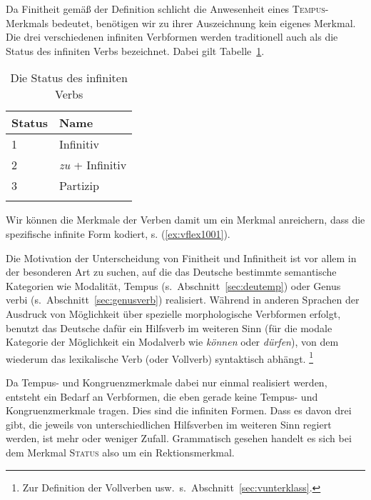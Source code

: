 
Da Finitheit gemäß der Definition schlicht die Anwesenheit eines \textsc{Tempus}-\-Merk\-mals bedeutet, benötigen wir zu ihrer Auszeichnung kein eigenes Merkmal.
Die drei verschiedenen infiniten Verbformen werden traditionell auch als die Status des infiniten Verbs bezeichnet.
Dabei gilt Tabelle~\ref{tab:status}.

\begin{table}
  \centering
  \begin{tabular}{ll}
    \lsptoprule
    \textbf{Status} & \textbf{Name} \\
    \midrule
    1 & Infinitiv \\
    2 & \textit{zu} + Infinitiv \\
    3 & Partizip \\
    \lspbottomrule
  \end{tabular}
  \caption{Die Status des infiniten Verbs}
  \label{tab:status}
\end{table}

Wir können die Merkmale der Verben damit um ein Merkmal anreichern, dass die spezifische infinite Form kodiert, s. (\ref{ex:vflex1001}).

\begin{exe}
\end{exe}

Die Motivation der Unterscheidung von Finitheit und Infinitheit ist vor allem in der besonderen Art zu suchen, auf die das Deutsche bestimmte semantische Kategorien wie Modalität, Tempus (s.\ Abschnitt~\ref{sec:deutemp}) oder Genus verbi (s.\ Abschnitt~\ref{sec:genusverb}) realisiert.
Während in anderen Sprachen \zB der Ausdruck von Möglichkeit über spezielle morphologische Verbformen erfolgt, benutzt das Deutsche dafür ein Hilfsverb im weiteren Sinn (für die modale Kategorie der Möglichkeit ein Modalverb wie \textit{können} oder \textit{dürfen}), von dem wiederum das lexikalische Verb (oder Vollverb) syntaktisch abhängt.%
\footnote{Zur Definition der Vollverben usw.\ s.\ Abschnitt~\ref{sec:vunterklass}.}

Da Tempus- und Kongruenzmerkmale dabei nur einmal realisiert werden, entsteht ein Bedarf an Verbformen, die eben gerade keine Tempus- und Kongruenzmerkmale tragen.
Dies sind die infiniten Formen.
Dass es davon drei gibt, die jeweils von unterschiedlichen Hilfsverben im weiteren Sinn regiert werden, ist mehr oder weniger Zufall.
Grammatisch gesehen handelt es sich bei dem Merkmal \textsc{Status} also um ein Rektionsmerkmal.

